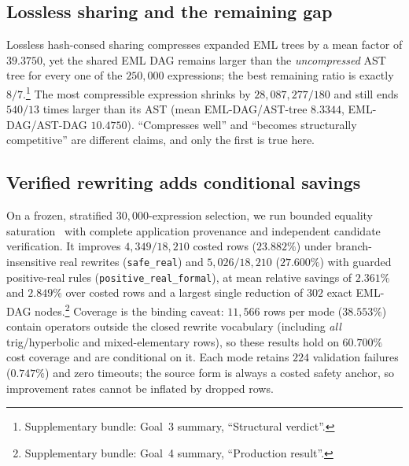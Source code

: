 \documentclass[11pt]{article}
\newcommand{\anchor}[1]{\footnote{#1}}
\begin{document}
\subsection{Lossless sharing and the remaining gap}
Lossless hash-consed sharing compresses expanded EML trees by a mean factor of
$39.3750$, yet the shared EML DAG remains larger than the \emph{uncompressed} AST
tree for every one of the $250{,}000$ expressions; the best remaining ratio is
exactly $8/7$.\anchor{Supplementary bundle: Goal~3 summary, ``Structural
verdict''.} The most compressible
expression shrinks by $28{,}087{,}277/180$ and still ends $540/13$ times larger
than its AST (mean EML-DAG/AST-tree $8.3344$, EML-DAG/AST-DAG $10.4750$).
``Compresses well'' and ``becomes structurally competitive'' are different claims,
and only the first is true here.

\subsection{Verified rewriting adds conditional savings}
On a frozen, stratified $30{,}000$-expression selection, we run bounded
equality saturation~\cite{tate2009equality,willsey2021egg} with complete
application provenance and independent candidate verification. It improves
$4{,}349/18{,}210$ costed rows ($23.882\%$) under branch-insensitive real
rewrites (\texttt{safe\_real}) and $5{,}026/18{,}210$ ($27.600\%$) with guarded
positive-real rules (\texttt{positive\_real\_formal}), at mean relative savings
of $2.361\%$ and $2.849\%$ over costed rows and a largest single reduction of
$302$ exact EML-DAG nodes.\anchor{Supplementary bundle: Goal~4 summary,
``Production result''.} Coverage is the binding
caveat: $11{,}566$ rows per mode ($38.553\%$) contain operators outside the closed
rewrite vocabulary (including \emph{all} trig/hyperbolic and mixed-elementary
rows), so these results hold on $60.700\%$ cost coverage and are conditional on
it. Each mode retains $224$ validation failures ($0.747\%$) and zero timeouts; the
source form is always a costed safety anchor, so improvement rates cannot be
inflated by dropped rows.
\end{document}
